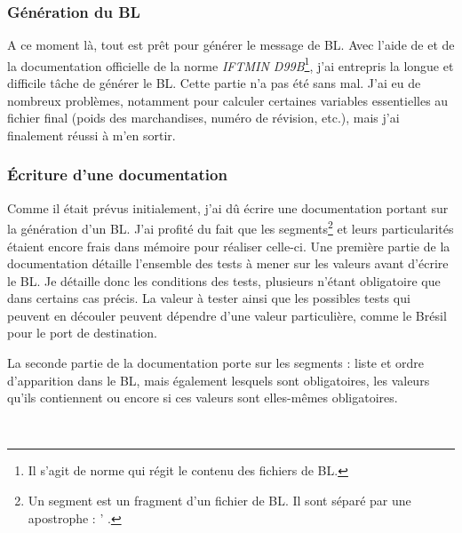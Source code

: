 \subsubsection{Génération du BL}
A ce moment là, tout est prêt pour générer le message de BL. Avec l'aide de \pireus{} et de la documentation officielle de la norme \emph{IFTMIN D99B}\footnote{Il s'agit de norme qui régit le contenu des fichiers de BL.}, j'ai entrepris la longue et difficile tâche de générer le BL. Cette partie n'a pas été sans mal. J'ai eu de nombreux problèmes, notamment pour calculer certaines variables essentielles au fichier final (poids des marchandises, numéro de révision, etc.), mais j'ai finalement réussi à m'en sortir.

\subsubsection{Écriture d'une documentation}
Comme il était prévus initialement, j'ai dû écrire une documentation portant sur la génération d'un BL. J'ai profité du fait que les segments\footnote{Un segment est un fragment d'un fichier de BL. Il sont séparé par une apostrophe : \og ' \fg.} et leurs particularités étaient encore frais dans mémoire pour réaliser celle-ci. Une première partie de la documentation détaille l'ensemble des tests à mener sur les valeurs avant d'écrire le BL. Je détaille donc les conditions des tests, plusieurs n'étant obligatoire que dans certains cas précis. La valeur à tester ainsi que les possibles tests qui peuvent en découler peuvent dépendre d'une valeur particulière, comme le Brésil pour le port de destination.

La seconde partie de la documentation porte sur les segments : liste et ordre d'apparition dans le BL, mais également lesquels sont obligatoires, les valeurs qu'ils contiennent ou encore si ces valeurs sont elles-mêmes obligatoires.

~

